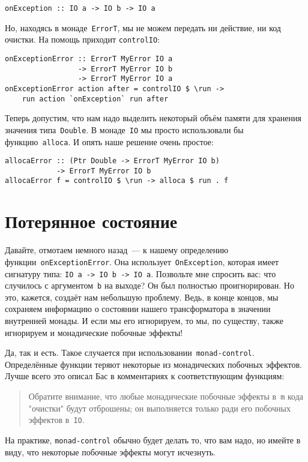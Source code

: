 \begin{lstlisting}
onException :: IO a -> IO b -> IO a
\end{lstlisting}

Но, находясь в монаде~\lstinline'ErrorT', мы не можем передать ни действие, ни
код очистки. На помощь приходит \lstinline'controlIO':

\begin{lstlisting}
onExceptionError :: ErrorT MyError IO a
                 -> ErrorT MyError IO b
                 -> ErrorT MyError IO a
onExceptionError action after = controlIO $ \run ->
    run action `onException` run after
\end{lstlisting}

Теперь допустим, что нам надо выделить некоторый объём памяти для хранения
значения типа~\lstinline'Double'. В монаде~\lstinline'IO' мы просто
использовали бы функцию~\lstinline'alloca'. И опять наше решение очень простое:

\begin{lstlisting}
allocaError :: (Ptr Double -> ErrorT MyError IO b)
            -> ErrorT MyError IO b
allocaError f = controlIO $ \run -> alloca $ run . f
\end{lstlisting}

\section{Потерянное состояние}
Давайте, отмотаем немного назад~--- к нашему определению
функции~\lstinline'onExceptionError'. Она использует~\lstinline'OnException',
которая имеет сигнатуру типа: \lstinline'IO a -> IO b -> IO a'. Позвольте мне
спросить вас: что случилось с аргументом~\lstinline'b' на выходе? Он был
полностью проигнорирован. Но это, кажется, создаёт нам небольшую проблему.
Ведь, в конце концов, мы сохраняем информацию о состоянии нашего трансформатора
в значении внутренней монады. И если мы его игнорируем, то мы, по существу,
также игнорируем и монадические побочные эффекты!

Да, так и есть. Такое случается при использовании~\texttt{monad-control}.
Определённые функции теряют некоторые из монадических побочных эффектов. Лучше
всего это описал Бас в комментариях к соответствующим функциям:
\begin{quote}
Обратите внимание, что любые монадические побочные эффекты в~\lstinline'm' кода
"очистки" будут отброшены; он выполняется только ради его побочных эффектов
в~\lstinline'IO'.
\end{quote}
На практике, \texttt{monad-control} обычно будет делать то, что вам надо, но
имейте в виду, что некоторые побочные эффекты могут исчезнуть.

